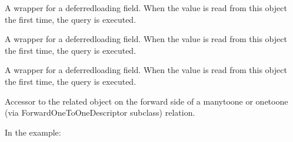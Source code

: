 \documentclass[letterpaper,10pt,spanish]{sphinxmanual}
\begin{document}
\begin{fulllineitems}
\begin{fulllineitems}
\end{fulllineitems}



\begin{fulllineitems}

\pysigstartsignatures
{}
\pysigstopsignatures
\sphinxAtStartPar
A wrapper for a deferred\sphinxhyphen{}loading field. When the value is read from this
object the first time, the query is executed.

\end{fulllineitems}



\begin{fulllineitems}

\pysigstartsignatures
{}
\pysigstopsignatures
\sphinxAtStartPar
A wrapper for a deferred\sphinxhyphen{}loading field. When the value is read from this
object the first time, the query is executed.

\end{fulllineitems}



\begin{fulllineitems}

\pysigstartsignatures
{}
\pysigstopsignatures
\sphinxAtStartPar
A wrapper for a deferred\sphinxhyphen{}loading field. When the value is read from this
object the first time, the query is executed.

\end{fulllineitems}



\begin{fulllineitems}

\pysigstartsignatures
{}
\pysigstopsignatures
\sphinxAtStartPar
Accessor to the related object on the forward side of a many\sphinxhyphen{}to\sphinxhyphen{}one or
one\sphinxhyphen{}to\sphinxhyphen{}one (via ForwardOneToOneDescriptor subclass) relation.

\sphinxAtStartPar
In the example:

\begin{sphinxVerbatim}[commandchars=\\\{\}]
 
       
\end{sphinxVerbatim}


\end{fulllineitems}
\end{fulllineitems}
\end{document}
